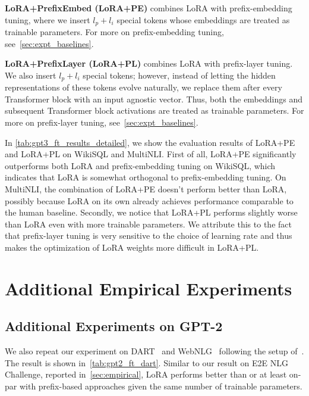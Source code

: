 \textbf{LoRA+PrefixEmbed (LoRA+PE)} combines LoRA with prefix-embedding tuning, where we insert $l_p+l_i$ special tokens whose embeddings are treated as trainable parameters.
For more on prefix-embedding tuning, see~\autoref{sec:expt_baselines}.

\textbf{LoRA+PrefixLayer (LoRA+PL)} combines LoRA with prefix-layer tuning.
We also insert $l_p+l_i$ special tokens; however, instead of letting the hidden representations of these tokens evolve naturally, we replace them after every Transformer block with an input agnostic vector.
Thus, both the embeddings and subsequent Transformer block activations are treated as trainable parameters.
For more on prefix-layer tuning, see~\autoref{sec:expt_baselines}.

In \autoref{tab:gpt3_ft_results_detailed}, we show the evaluation results of LoRA+PE and LoRA+PL on WikiSQL and MultiNLI.
First of all, LoRA+PE significantly outperforms both LoRA and prefix-embedding tuning on WikiSQL, which indicates that LoRA is somewhat orthogonal to prefix-embedding tuning.
On MultiNLI, the combination of LoRA+PE doesn't perform better than LoRA, possibly because LoRA on its own  already achieves performance comparable to the human baseline.
Secondly, we notice that LoRA+PL performs slightly worse than LoRA even with more trainable parameters.
We attribute this to the fact that prefix-layer tuning is very sensitive to the choice of learning rate and thus makes the optimization of LoRA weights more difficult in LoRA+PL. 





\section{Additional Empirical Experiments}
\label{app:extra_expt}

\subsection{Additional Experiments on GPT-2}
\label{app:gpt2_extra}

We also repeat our experiment on DART~\citep{nan2020dart} and WebNLG~\citep{gardent2017webnlg} following the setup of~\cite{li_prefix-tuning_2021}.
The result is shown in~\autoref{tab:gpt2_ft_dart}.
Similar to our result on E2E NLG Challenge, reported in~\autoref{sec:empirical}, LoRA performs better than or at least on-par with prefix-based approaches given the same number of trainable parameters.

